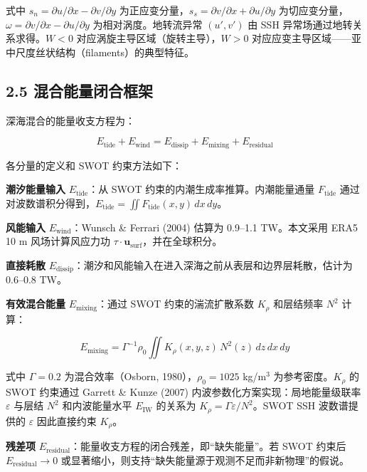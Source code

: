 \documentclass[11pt,a4paper]{article}
\begin{document}
式中 $s_n = \partial u/\partial x - \partial v/\partial y$ 为正应变分量，$s_s = \partial v/\partial x + \partial u/\partial y$ 为切应变分量，$\omega = \partial v/\partial x - \partial u/\partial y$ 为相对涡度。地转流异常 $(u', v')$ 由 SSH 异常场通过地转关系求得。$W < 0$ 对应涡旋主导区域（旋转主导），$W > 0$ 对应应变主导区域——亚中尺度丝状结构（filaments）的典型特征。\par

\subsection*{2.5  混合能量闭合框架}

深海混合的能量收支方程为：

\begin{equation}
E_{\text{tide}} + E_{\text{wind}} = E_{\text{dissip}} + E_{\text{mixing}} + E_{\text{residual}}
\label{eq:budget}
\end{equation}

各分量的定义和 SWOT 约束方法如下：

\textbf{潮汐能量输入} $E_{\text{tide}}$：从 SWOT 约束的内潮生成率推算。内潮能量通量 $F_{\text{tide}}$ 通过对波数谱积分得到，$E_{\text{tide}} = \iint F_{\text{tide}}(x,y)\,dx\,dy$。

\textbf{风能输入} $E_{\text{wind}}$：Wunsch \& Ferrari (2004) 估算为 0.9--1.1 TW。本文采用 ERA5 10 m 风场计算风应力功 $\tau \cdot \mathbf{u}_{\text{surf}}$，并在全球积分。

\textbf{直接耗散} $E_{\text{dissip}}$：潮汐和风能输入在进入深海之前从表层和边界层耗散，估计为 0.6--0.8 TW。

\textbf{有效混合能量} $E_{\text{mixing}}$：通过 SWOT 约束的湍流扩散系数 $K_\rho$ 和层结频率 $N^2$ 计算：

\begin{equation}
E_{\text{mixing}} = \Gamma^{-1} \rho_0 \iint K_\rho(x,y,z)\, N^2(z)\, dz\, dx\, dy
\end{equation}

式中 $\Gamma = 0.2$ 为混合效率（Osborn, 1980），$\rho_0 = 1025$ kg/m$^3$ 为参考密度。$K_\rho$ 的 SWOT 约束通过 Garrett \& Kunze (2007) 内波参数化方案实现：局地能量级联率 $\varepsilon$ 与层结 $N^2$ 和内波能量水平 $E_{\text{IW}}$ 的关系为 $K_\rho = \Gamma \varepsilon / N^2$。SWOT SSH 波数谱提供的 $\varepsilon$ 因此直接约束 $K_\rho$。

\textbf{残差项} $E_{\text{residual}}$：能量收支方程的闭合残差，即``缺失能量''。若 SWOT 约束后 $E_{\text{residual}} \to 0$ 或显著缩小，则支持``缺失能量源于观测不足而非新物理''的假说。\par
\end{document}

